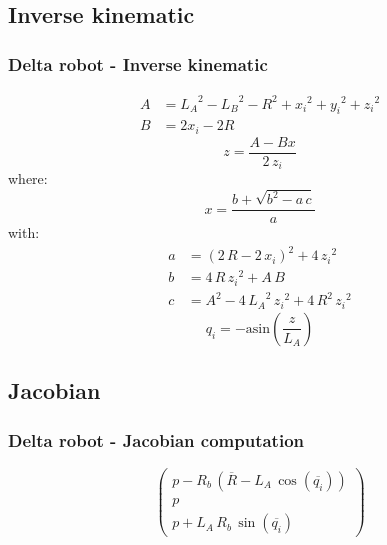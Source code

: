 \subsection{Inverse kinematic}
\begin{frame}
	\frametitle{Delta robot - Inverse kinematic}
	\begin{align}
		A &= {L_{A}}^2-{L_{B}}^2-R^2+{x_{i}}^2+{y_{i}}^2+{z_{i}}^2\\
		B &= 2x_{i}-2R
	\end{align}
	\begin{equation}
		z = \frac{A - Bx}{2\,z_{i}}
	\end{equation}
	where:
	\begin{equation}
		x = \frac{b+\sqrt{b^2-a\,c}}{a}
	\end{equation}
	with:
	\begin{align}
		a &= {\left(2\,R-2\,x_{i}\right)}^2+4\,{z_{i}}^2\\
		b &= 4\,R\,{z_{i}}^2 + A\,B\\
		c &= A^2 - 4\,{L_{A}}^2\,{z_{i}}^2+4\,R^2\,{z_{i}}^2
	\end{align}
	\begin{equation}
		q_i = -\mathrm{asin}\left(\frac{z}{L_{A}}\right)
	\end{equation}
\end{frame}
%
\subsection{Jacobian}
\begin{frame}
	\frametitle{Delta robot - Jacobian computation}
	\begin{equation}
		\left(\begin{array}{c} p-R_{b}\,\left(\overline{R}-L_{A}\,\cos\left(\overline{q_{i}}\right)\right)\\ p\\ p+L_{A}\,R_{b}\,\sin\left(\overline{q_{i}}\right) \end{array}\right)
	\end{equation}
\end{frame}
